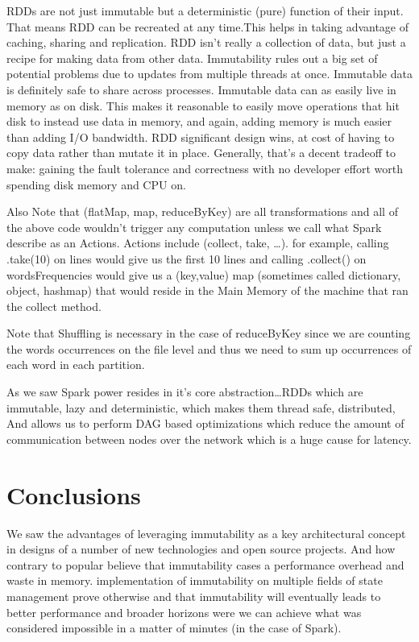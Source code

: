 \documentclass[12pt,twoside]{article}
\begin{document}
RDDs are not just immutable but a deterministic (pure) function of their input. That means RDD can be recreated at any time.This helps in taking advantage of caching, sharing and replication. RDD isn't really a collection of data, but just a recipe for making data from other data. Immutability rules out a big set of potential problems due to updates from multiple threads at once. Immutable data is definitely safe to share across processes. Immutable data can as easily live in memory as on disk. This makes it reasonable to easily move operations that hit disk to instead use data in memory, and again, adding memory is much easier than adding I/O bandwidth. RDD significant design wins, at cost of having to copy data rather than mutate it in place. Generally, that's a decent tradeoff to make: gaining the fault tolerance and correctness with no developer effort worth spending disk memory and CPU on.

Also Note that (flatMap, map, reduceByKey) are all transformations and all of the above code wouldn't trigger any computation unless we call what Spark describe as an Actions.\newline
Actions include (collect, take, \dots). for example, calling .take(10) on lines would give us the first 10 lines and calling .collect() on wordsFrequencies would give us a (key,value) map (sometimes called dictionary, object, hashmap) that would reside in the Main Memory of the machine that ran the collect method.

Note that Shuffling is necessary in the case of reduceByKey since we are counting the words occurrences on the file level and thus we need to sum up occurrences of each word in each partition.

As we saw Spark power resides in it's core abstraction\dots RDDs which are immutable, lazy and deterministic, which makes them thread safe, distributed, And allows us to perform DAG based optimizations which reduce the amount of communication between nodes over the network which is a huge cause for latency.


\section{Conclusions}
We saw the advantages of leveraging immutability as a key architectural concept in designs of a number of new technologies and open source projects. And how contrary to popular believe that immutability cases a performance overhead and waste in memory. implementation of immutability on multiple fields of state management prove otherwise and that immutability will eventually leads to better performance and broader horizons were we can achieve what was considered impossible in a matter of minutes (in the case of Spark).
\end{document}
